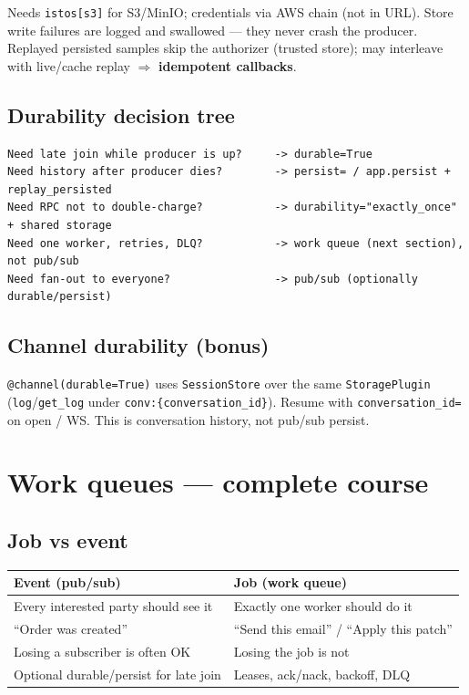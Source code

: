 \documentclass[11pt,a4paper]{article}
\begin{document}
Needs \texttt{istos[s3]} for S3/MinIO; credentials via AWS chain (not in URL).
Store write failures are logged and swallowed --- they never crash the producer.
Replayed persisted samples skip the authorizer (trusted store); may interleave
with live/cache replay $\Rightarrow$ \textbf{idempotent callbacks}.

\subsection{Durability decision tree}

\begin{lstlisting}[language={}]
Need late join while producer is up?     -> durable=True
Need history after producer dies?        -> persist= / app.persist + replay_persisted
Need RPC not to double-charge?           -> durability="exactly_once" + shared storage
Need one worker, retries, DLQ?           -> work queue (next section), not pub/sub
Need fan-out to everyone?                -> pub/sub (optionally durable/persist)
\end{lstlisting}

\subsection{Channel durability (bonus)}

\texttt{@channel(durable=True)} uses \texttt{SessionStore} over the same
\texttt{StoragePlugin} (\texttt{log}/\texttt{get\_log} under
\texttt{conv:\{conversation\_id\}}). Resume with \texttt{conversation\_id=} on
open / WS. This is conversation history, not pub/sub persist.

\section{Work queues --- complete course}
\label{sec:queues}

\subsection{Job vs event}

\begin{center}
\begin{tabularx}{\textwidth}{@{}X X@{}}
\toprule
\textbf{Event (pub/sub)} & \textbf{Job (work queue)} \\
\midrule
Every interested party should see it & Exactly one worker should do it \\
``Order was created'' & ``Send this email'' / ``Apply this patch'' \\
Losing a subscriber is often OK & Losing the job is not \\
Optional durable/persist for late join & Leases, ack/nack, backoff, DLQ \\
\bottomrule
\end{tabularx}
\end{center}
\end{document}
